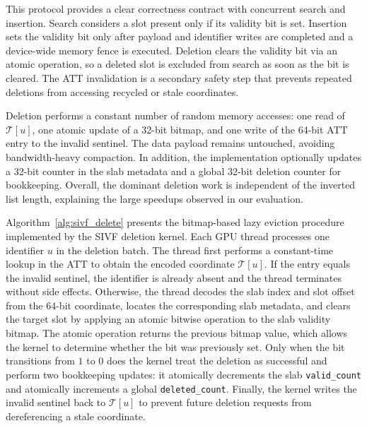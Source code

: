 \documentclass[sigconf,anonymous]{acmart}
\theoremstyle{plain}
\theoremstyle{definition}
\theoremstyle{remark}
\begin{document}
This protocol provides a clear correctness contract with concurrent search and insertion. Search considers a slot present only if its validity bit is set. Insertion sets the validity bit only after payload and identifier writes are completed and a device-wide memory fence is executed. Deletion clears the validity bit via an atomic operation, so a deleted slot is excluded from search as soon as the bit is cleared. The ATT invalidation is a secondary safety step that prevents repeated deletions from accessing recycled or stale coordinates.

Deletion performs a constant number of random memory accesses: one read of $\mathcal{T}[u]$, one atomic update of a 32-bit bitmap, and one write of the 64-bit ATT entry to the invalid sentinel. The data payload remains untouched, avoiding bandwidth-heavy compaction. In addition, the implementation optionally updates a 32-bit counter in the slab metadata and a global 32-bit deletion counter for bookkeeping. Overall, the dominant deletion work is independent of the inverted list length, explaining the large speedups observed in our evaluation.

Algorithm~\ref{alg:sivf_delete} presents the bitmap-based lazy eviction procedure implemented by the SIVF deletion kernel. 
Each GPU thread processes one identifier $u$ in the deletion batch. 
The thread first performs a constant-time lookup in the ATT to obtain the encoded coordinate $\mathcal{T}[u]$. 
If the entry equals the invalid sentinel, the identifier is already absent and the thread terminates without side effects. 
Otherwise, the thread decodes the slab index and slot offset from the 64-bit coordinate, locates the corresponding slab metadata, and clears the target slot by applying an atomic bitwise operation to the slab validity bitmap. 
The atomic operation returns the previous bitmap value, which allows the kernel to determine whether the bit was previously set. 
Only when the bit transitions from $1$ to $0$ does the kernel treat the deletion as successful and perform two bookkeeping updates: it atomically decrements the slab \texttt{valid\_count} and atomically increments a global \texttt{deleted\_count}. 
Finally, the kernel writes the invalid sentinel back to $\mathcal{T}[u]$ to prevent future deletion requests from dereferencing a stale coordinate. 
\end{document}
